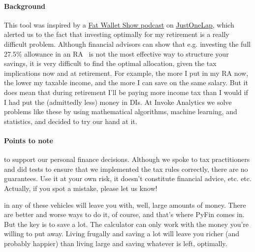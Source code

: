 \documentclass[a4paper, justified]{tufte-handout}
\begin{document}
\paragraph{Background} This tool was inspired by a \href{https://justonelap.com/podcast-can-one-etf-rule/}{Fat Wallet Show podcast} on \href{http://justonelap.com}{JustOneLap}, which alerted us to the fact that investing optimally for my retirement is a really difficult problem. Although financial advisors can show that e.g. investing the full 27.5\% allowance in an RA~ is not the most effective way to structure your savings, it is very difficult to find the optimal allocation, given the tax implications now and at retirement. For example, the more I put in my RA now, the lower my taxable income, and the more I can save on the same salary. But it does mean that during retirement I'll be paying more income tax than I would if I had put the (admittedly less) money in DIs.
At Invoke Analytics we solve problems like these by using mathematical algorithms, machine learning, and statistics, and decided to try our hand at it. 

\paragraph{Points to note}  to support our personal finance decisions. Although we spoke to tax practitioners and did tests to ensure that we implemented the tax rules correctly, there are no guarantees. Use it at your own risk, it doesn't constitute financial advice, etc. etc. Actually, if you spot a mistake, please let us know!

 in any of these vehicles will leave you with, well, large amounts of money. There are better and worse ways to do it, of course, and that's where PyFin comes in. But the key is to save a lot. The calculator can only work with the money you're willing to put away. Living frugally and saving a lot will leave you richer (and probably happier) than living large and saving whatever is left, optimally.
\end{document}
